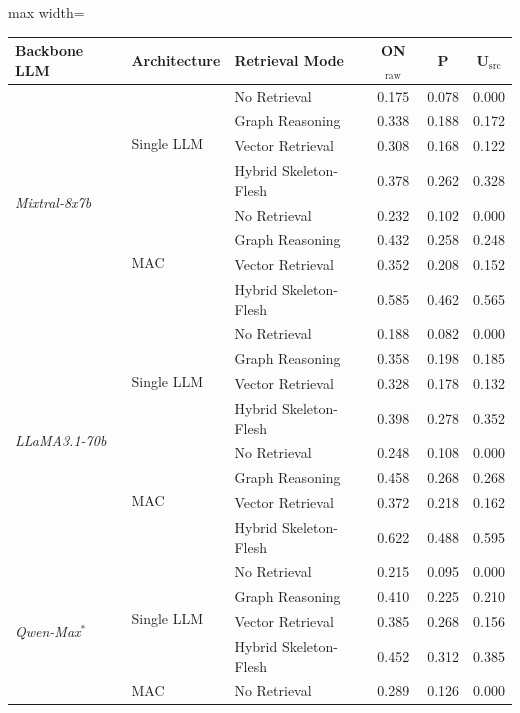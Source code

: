 \documentclass[runningheads]{llncs}
\begin{document}
\begin{table}[t]
\centering
\small
\begin{adjustbox}{max width=\textwidth}
\begin{tabular}{lllccc}
\toprule
\textbf{Backbone LLM} & \textbf{Architecture} & \textbf{Retrieval Mode} & \textbf{ON$_{\text{raw}}$} & \textbf{P} & \textbf{U$_{\text{src}}$} \\
\midrule
\multirow{8}{*}{\textit{Mixtral-8x7b}} 
 & \multirow{4}{*}{Single LLM} & No Retrieval & 0.175 & 0.078 & 0.000 \\
 &  & Graph Reasoning & 0.338 & 0.188 & 0.172 \\
 &  & Vector Retrieval & 0.308 & 0.168 & 0.122 \\
 &  & Hybrid Skeleton-Flesh & 0.378 & 0.262 & 0.328 \\
\cmidrule{2-6}
 & \multirow{4}{*}{MAC} & No Retrieval & 0.232 & 0.102 & 0.000 \\
 &  & Graph Reasoning & 0.432 & 0.258 & 0.248 \\
 &  & Vector Retrieval & 0.352 & 0.208 & 0.152 \\
 &  & Hybrid Skeleton-Flesh & 0.585 & 0.462 & 0.565 \\
\midrule
\multirow{8}{*}{\textit{LLaMA3.1-70b}} 
 & \multirow{4}{*}{Single LLM} & No Retrieval & 0.188 & 0.082 & 0.000 \\
 &  & Graph Reasoning & 0.358 & 0.198 & 0.185 \\
 &  & Vector Retrieval & 0.328 & 0.178 & 0.132 \\
 &  & Hybrid Skeleton-Flesh & 0.398 & 0.278 & 0.352 \\
\cmidrule{2-6}
 & \multirow{4}{*}{MAC} & No Retrieval & 0.248 & 0.108 & 0.000 \\
 &  & Graph Reasoning & 0.458 & 0.268 & 0.268 \\
 &  & Vector Retrieval & 0.372 & 0.218 & 0.162 \\
 &  & Hybrid Skeleton-Flesh & 0.622 & 0.488 & 0.595 \\
\midrule
\multirow{8}{*}{\textit{Qwen-Max}$^*$} 
 & \multirow{4}{*}{Single LLM} & No Retrieval & 0.215 & 0.095 & 0.000 \\
 &  & Graph Reasoning & 0.410 & 0.225 & 0.210 \\
 &  & Vector Retrieval & 0.385 & 0.268 & 0.156 \\
 &  & Hybrid Skeleton-Flesh & 0.452 & 0.312 & 0.385 \\
\cmidrule{2-6}
 & \multirow{4}{*}{MAC} & No Retrieval & 0.289 & 0.126 & 0.000 \\

\end{tabular}
\end{adjustbox}
\end{table}
\end{document}
